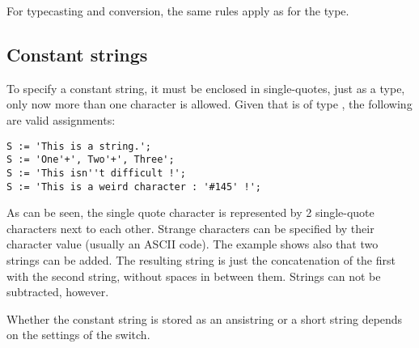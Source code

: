For typecasting and conversion, the same rules apply as for the  type.

\subsection{Constant strings}
To specify a constant string, it must be enclosed in single-quotes, just
as a  type, only now more than one character is allowed.
Given that  is of type , the following are valid assignments:
\begin{verbatim}
S := 'This is a string.';
S := 'One'+', Two'+', Three';
S := 'This isn''t difficult !';
S := 'This is a weird character : '#145' !';
\end{verbatim}
As can be seen, the single quote character is represented by 2 single-quote
characters next to each other. Strange characters can be specified by their
character value (usually an ASCII code).
The example shows also that two strings can be added. The resulting string is
just the concatenation of the first with the second string, without spaces in
between them. Strings can not be subtracted, however.

Whether the constant string is stored as an ansistring or a short string
depends on the settings of the  switch.


